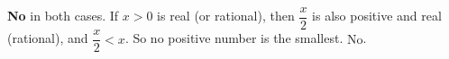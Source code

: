 \textbf{No} in both cases. If $x>0$ is real (or rational), then $\dfrac x2$ is also positive and real (rational), and $\dfrac x2<x$. So no positive number is the smallest. $\boxed{\text{No}}$.
